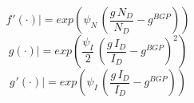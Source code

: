 \documentclass[10pt,a4paper]{article}
\begin{document}
\begin{dmath}
{\left.       f^‎{\prime}\left( \cdot \right)   \right|}=exp\left(\psi_N\, \left(\frac{{g}\, {N_D}}{{N_D}}-g^{BGP}\right)\right)
\end{dmath}
\begin{dmath}
{\left.       g\left( \cdot \right)            \right|}=exp\left(\frac{\psi_I}{2}\, \left(\frac{{g}\, {I_D}}{{I_D}}-g^{BGP}\right)^{2}\right)
\end{dmath}
\begin{dmath}
{\left.       g^‎{\prime}\left( \cdot \right)   \right|}=exp\left(\psi_I\, \left(\frac{{g}\, {I_D}}{{I_D}}-g^{BGP}\right)\right)
\end{dmath}
\end{document}
